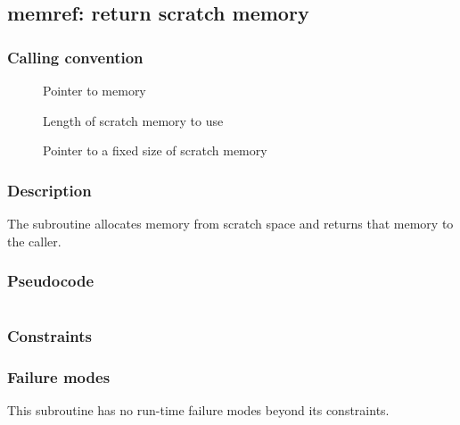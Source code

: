 \clearpage
{}
{}
\label{subr:memref}
\subsection*{memref: return scratch memory}

\subsubsection*{Calling convention}

\begin{description}
\item[] Pointer to memory
\item[] Length of scratch memory to use
\item[] Pointer to a fixed size of scratch memory
\end{description}

\subsubsection*{Description}

The  subroutine allocates memory from scratch
space and returns that memory to the caller.
\subsubsection*{Pseudocode}

\begin{verbatim}
\end{verbatim}

\subsubsection*{Constraints}

\subsubsection*{Failure modes}

This subroutine has no run-time failure modes beyond its constraints.
